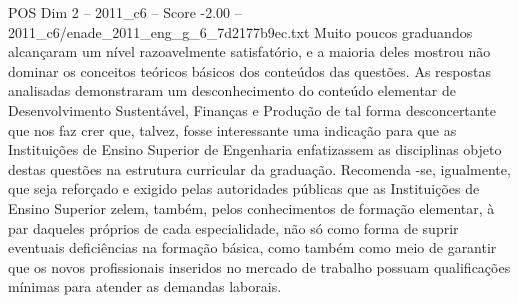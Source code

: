 \begin{textsample}{POS Dim 2 – 2011\_c6 – Score -2.00 – 2011\_c6/enade\_2011\_eng\_g\_6\_7d2177b9ec.txt}
Muito poucos graduandos alcançaram um nível razoavelmente satisfatório, e a maioria deles mostrou não dominar os conceitos teóricos básicos dos conteúdos das questões.
As respostas analisadas demonstraram um desconhecimento do conteúdo elementar de Desenvolvimento Sustentável, Finanças e Produção de tal forma desconcertante que nos faz crer que, talvez, fosse interessante uma indicação para que as Instituições de Ensino Superior de Engenharia enfatizassem as disciplinas objeto destas questões na estrutura curricular da graduação.
Recomenda -se, igualmente, que seja reforçado e exigido pelas autoridades públicas que as Instituições de Ensino Superior zelem, também, pelos conhecimentos de formação elementar, à par daqueles próprios de cada especialidade, não só como forma de suprir eventuais deficiências na formação básica, como também como meio de garantir que os novos profissionais inseridos no mercado de trabalho possuam qualificações mínimas para atender as demandas laborais.

\end{textsample}
